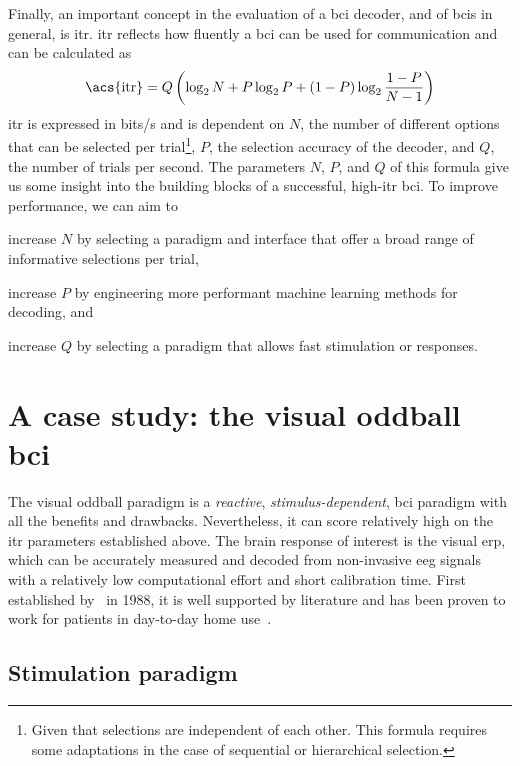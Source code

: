 Finally, an important concept in the evaluation of a \ac{bci} decoder, and of \acp{bci}
in general, is \ac{itr}.
\Ac{itr} reflects how fluently a \ac{bci} can be used for communication and can be
calculated as
\begin{equation}
  \text{\acs{itr}} = Q\left(\log_2N+P\log_2P+(1-P)\log_2\frac{1-P}{N-1}\right)
\end{equation}
\Ac{itr} is expressed in bits/s and is dependent on $N$, the number of different options
that can be selected per trial\footnote{Given that selections are independent of each
other. This formula requires some adaptations in the case of sequential or hierarchical
selection.}, $P$, the selection accuracy of the decoder, and $Q$, the number of trials
per second.
The parameters $N$, $P$, and $Q$ of this formula give us some insight into the building
blocks of a successful, high-\ac{itr} \ac{bci}.
To improve performance, we can aim to
\begin{enumerate*}[label={\arabic*})]
\item increase $N$ by selecting a paradigm and interface that offer a broad range of
informative selections per trial,
\item increase $P$ by engineering more performant machine learning methods for decoding,
and
\item increase $Q$ by selecting a paradigm that allows fast stimulation or responses.
\end{enumerate*}

\section{A case study: the visual oddball \acs{bci}}

The visual oddball paradigm is a \emph{reactive}, \emph{stimulus-dependent},
\ac{bci} paradigm with all the benefits and drawbacks.
Nevertheless, it can score relatively high on the \ac{itr} parameters established above.
The brain response of interest is the visual \ac{erp}, which can be accurately measured
and decoded from non-invasive \ac{eeg} signals with a relatively low computational
effort and short calibration time.
First established by~\cite{Farwell1988} in 1988, it is well supported by literature and
has been proven to work for patients in day-to-day home use~\cite{Wolpaw2018}.

\subsection{Stimulation paradigm}

